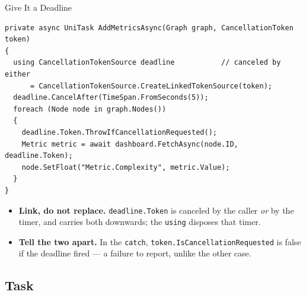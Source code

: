 \begin{solutionframe}{Give It a Deadline}
  \begin{lstlisting}[basicstyle=\scriptsize\ttfamily]
private async UniTask AddMetricsAsync(Graph graph, CancellationToken token)
{
  using CancellationTokenSource deadline           // canceled by either
      = CancellationTokenSource.CreateLinkedTokenSource(token);
  deadline.CancelAfter(TimeSpan.FromSeconds(5));
  foreach (Node node in graph.Nodes())
  {
    deadline.Token.ThrowIfCancellationRequested();
    Metric metric = await dashboard.FetchAsync(node.ID, deadline.Token);
    node.SetFloat("Metric.Complexity", metric.Value);
  }
}
  \end{lstlisting}

  \begin{itemize}
    \item \textbf{Link, do not replace.} \texttt{deadline.Token} is canceled
      by the caller \emph{or} by the timer, and carries both downwards; the
      \texttt{using} disposes that timer.
    \item \textbf{Tell the two apart.} In the \texttt{catch},
      \texttt{token.IsCancellationRequested} is false if the deadline fired
      --- a failure to report, unlike the other case.
  \end{itemize}
  \vspace{0.5ex}

\end{solutionframe}

\subsection{Task}

